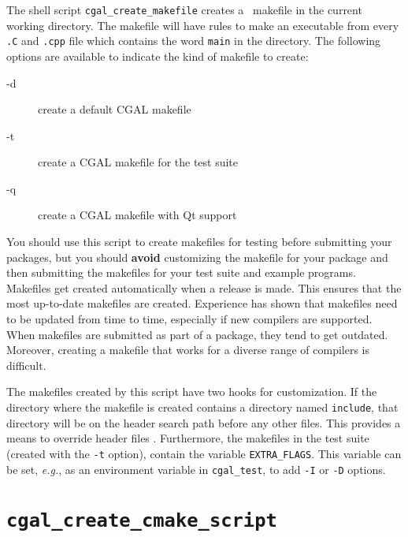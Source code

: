 The shell script
{{\tt cgal\_create\_makefile}} creates a \cgal\ makefile
in the current working directory.
The makefile will have rules to make an executable from every {\tt .C}
and {\tt .cpp} file which contains the word {\tt main} in the directory.
The following options are available to indicate the kind of makefile
to create:
\begin{description}
\item[-d]   create a default CGAL makefile
\item[-t]   create a CGAL makefile for the test suite
\item[-q]   create a CGAL makefile with Qt support
\end{description}

You should use this script to create makefiles for testing before submitting
your packages, but you should {\bf avoid} customizing the makefile for your
package and then submitting the makefiles for your test suite and example
programs.
Makefiles get created automatically when a release is made. This ensures
that the most up-to-date makefiles are created. Experience has shown
that makefiles need to be updated from time to time, especially if new
compilers are supported. When makefiles are submitted as part of a package,
they tend to get outdated.
Moreover, creating a makefile that works for a diverse range of compilers
is difficult.

The makefiles created by this script have two hooks for customization.
If the directory
where the makefile is created contains a directory named {\tt include},%
that
directory will be on the header search path before any other files. This
provides a means to override header files%
.
Furthermore, the makefiles in the
test suite (created with the {\tt -t} option), contain the variable
{\tt EXTRA\_FLAGS}.%
This variable can be set, {\em e.g.}, as an environment variable in
{\tt cgal\_test}, to add {\tt -I} or {\tt -D} options.

\section{{\tt cgal\_create\_cmake\_script}}
\label{sec:cgal_create_cmake_script}

